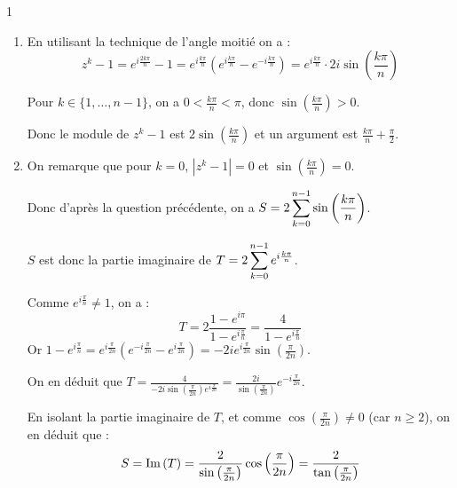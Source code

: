 \begin{correction}{1}
\begin{enumerate}
    \item En utilisant la technique de l'angle moitié on a :
    \[z^k - 1 = e^{i\frac{2k\pi}{n}} - 1 = e^{i\frac{k\pi}{n}} \left( e^{i\frac{k\pi}{n}} - e^{-i\frac{k\pi}{n}} \right) = e^{i\frac{k\pi}{n}} \cdot 2i \sin\left(\frac{k\pi}{n}\right)\]

    Pour $k \in \{1, \dots, n-1\}$, on a $0 < \frac{k\pi}{n} < \pi$, donc $\sin\left(\frac{k\pi}{n}\right) > 0$.

    Donc le module de $z^k-1$ est $2\sin\left(\frac{k\pi}{n}\right)$ et un argument est $\frac{k\pi}{n} + \frac{\pi}{2}$.
    \\

    \item On remarque que pour $k=0$, $|z^k-1| = 0$ et $\sin\left(\frac{k\pi}{n}\right) = 0$.
    
    Donc d'après la question précédente, on a $S = 2 \displaystyle\sum_{k=0}^{n-1} \sin\left(\frac{k\pi}{n}\right)$.

    $S$ est donc la partie imaginaire de $T = 2 \displaystyle\sum_{k=0}^{n-1} e^{i\frac{k\pi}{n}}$.

    Comme $e^{i\frac{\pi}{n}} \ne 1$, on a :
    \[ T = 2 \frac{1 - e^{i\pi}}{1 - e^{i\frac{\pi}{n}}} = \frac{4}{1 - e^{i\frac{\pi}{n}}} \]
    Or $1 - e^{i\frac{\pi}{n}} = e^{i\frac{\pi}{2n}} \left(e^{-i\frac{\pi}{2n}} - e^{i\frac{\pi}{2n}}\right) = -2i e^{i\frac{\pi}{2n}} \sin\left(\frac{\pi}{2n}\right)$.

    On en déduit que $T = \frac{4}{-2i \sin\left(\frac{\pi}{2n}\right) e^{i\frac{\pi}{2n}}} = \frac{2i}{\sin\left(\frac{\pi}{2n}\right)} e^{-i\frac{\pi}{2n}}$.

    En isolant la partie imaginaire de $T$, et comme $\cos\left(\frac{\pi}{2n}\right) \ne 0$ (car $n \geqslant 2$), on en déduit que :
    \[ S = \operatorname{Im} \,(T) = \frac{2}{\sin \left(\frac{\pi}{2n}\right)} \cos\left( \frac{\pi}{2n}\right) = \frac{2}{\tan\left( \frac{\pi}{2n}\right)} \]
\end{enumerate}
\end{correction}

